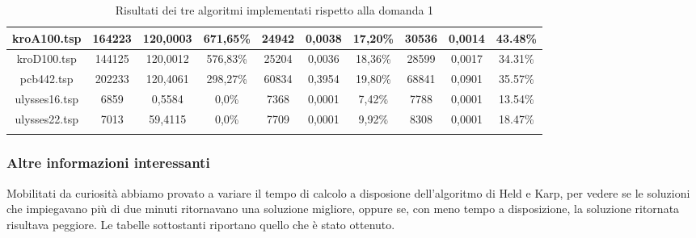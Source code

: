 \begin{center}
\begin{longtable}{|c|c|c|c|c|c|c|c|c|c|}
		kroA100.tsp& 164223 & 120,0003 & 671,65\% & 24942 & 0,0038 & 17,20\%&30536 &0,0014 &43.48\% \\ \hline
		kroD100.tsp& 144125 &120,0012 &576,83\% &25204 & 0,0036 & 18,36\% &28599 &0,0017 &34.31\% \\ \hline
		pcb442.tsp& 202233&120,4061 &298,27\% & 60834 & 0,3954 & 19,80\% &68841 &0,0901 & 35.57\%\\ \hline
		ulysses16.tsp&6859 &0,5584 & 0,0\% & 7368 & 0,0001 & 7,42\%&7788 & 0,0001 & 13.54\%\\ \hline
		ulysses22.tsp&7013 &59,4115 &0,0\% &  7709 & 0,0001 & 9,92\% &8308 &0,0001 &18.47\% \\ \hline		 
     \caption{Risultati dei tre algoritmi implementati rispetto alla domanda 1}
	\end{longtable}
\end{center}

\subsubsection{Altre informazioni interessanti}
Mobilitati da curiosità abbiamo provato a variare il tempo di calcolo a disposione dell'algoritmo di Held e Karp, per vedere se le soluzioni che impiegavano più di due minuti ritornavano una soluzione migliore, oppure se, con meno tempo a disposizione, la soluzione ritornata risultava peggiore. Le tabelle sottostanti riportano quello che è stato ottenuto.
